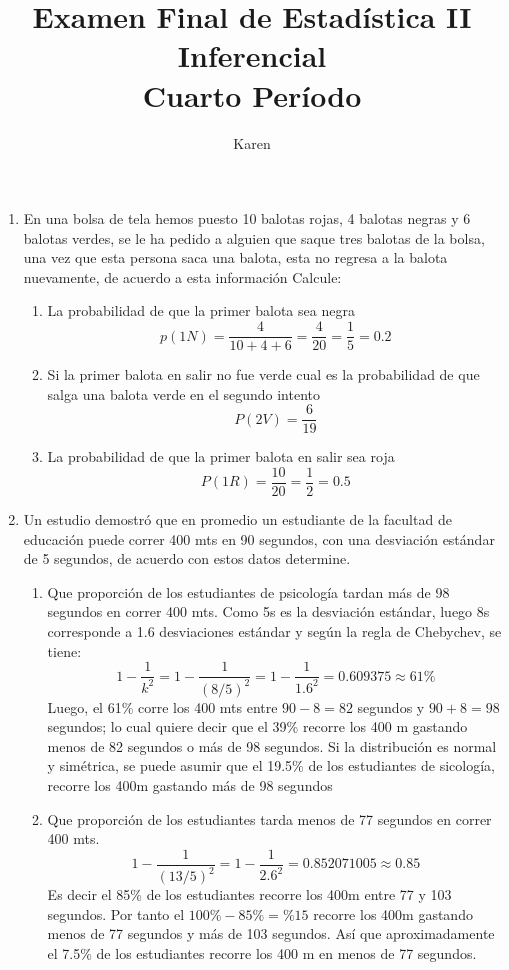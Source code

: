 \documentclass[10pt,a4paper]{article}
\author{Karen}
\title{Examen Final de Estadística II Inferencial\\
Cuarto Período}
\begin{document}
\maketitle
\begin{enumerate}
\item En una bolsa de tela hemos puesto 10 balotas rojas, 4 balotas negras y 6 balotas verdes, se le ha pedido a alguien que saque tres balotas de la bolsa, una vez que esta persona saca una balota, esta no regresa a la balota nuevamente, de acuerdo a esta información Calcule:
\begin{enumerate}
\item La probabilidad de que la primer balota sea negra
\[p(1N)=\dfrac{4}{10+4+6}=\dfrac{4}{20}=\dfrac{1}{5}=0.2\]
\item Si la primer balota en salir no fue verde cual es la probabilidad de que salga una balota verde en el segundo intento
\[P(2V)=\dfrac{6}{19}\]
\item La probabilidad de que la primer balota en salir sea roja
\[P(1R)=\dfrac{10}{20}=\dfrac{1}{2}=0.5\]
\end{enumerate}
\item Un estudio demostró que en promedio un estudiante de la facultad de educación puede correr 400 mts en 90 segundos, con una desviación estándar de 5 segundos, de acuerdo con estos datos determine.
\begin{enumerate}
\item Que proporción de los estudiantes de psicología tardan más de 98 segundos en correr 400 mts. Como 5s es la desviación estándar, luego 8s corresponde a 1.6 desviaciones estándar y según la regla de Chebychev, se tiene:
\[1-\dfrac{1}{k^{2}}=1-\dfrac{1}{(8/5)^{2}}=1-\dfrac{1}{1.6^{2}}=0.609375\approx 61\%\]
Luego, el 61\% corre los 400 mts entre $90-8=82$ segundos y $90+8=98$ segundos; lo cual quiere decir que el 39\% recorre los 400 m gastando menos de 82 segundos o más de 98 segundos. Si la distribución es normal y simétrica, se puede asumir que el 19.5\% de los estudiantes de sicología, recorre los 400m gastando más de 98 segundos
\item Que proporción de los estudiantes tarda menos de 77 segundos en correr 400 mts.
\[1-\dfrac{1}{(13/5)^{2}}=1-\dfrac{1}{2.6^{2}}=0.852071005\approx 0.85 \]
Es decir el 85\% de los estudiantes recorre los 400m entre 77 y 103 segundos. Por tanto el $100\%-85\%=\%15$ recorre los 400m gastando menos de 77 segundos y más de 103 segundos. Así que aproximadamente el 7.5\% de los estudiantes recorre los 400 m en menos de 77 segundos.
\end{enumerate}
\end{enumerate}
\end{document}
